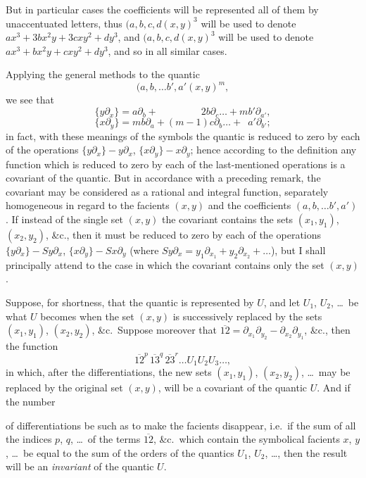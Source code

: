 \documentclass[12pt,a4paper]{article}
\begin{document}
\newpage
\setcounter{page}{230}

But in particular cases the coefficients will be represented all of them by unaccentuated letters, thus $(a, b, c, d \!\!\!\!(x, y)^3$ will be used to denote $ax^3 + 3bx^2y + 3cxy^2 + dy^3$, and $(a, b, c, d \!\!\!\!(x, y)^3$ will be used to denote $ax^3 + bx^2y + cxy^2 + dy^3$, and so in all similar cases.

Applying the general methods to the quantic
\[
(a, b, \ldots b', a' \!\!\!\!(x, y)^m,
\]
we see that
\[
\{y\partial_x\} = a\partial_b + \phantom{(m-1)} 2b\partial_c \ldots + mb'\partial_{a'},
\]
\[
\{x\partial_y\} = mb\partial_a + (m-1)c\partial_b \ldots + \phantom{2} a'\partial_{b'};
\]
in fact, with these meanings of the symbols the quantic is reduced to zero by each of the operations $\{y\partial_x\} - y\partial_x$, $\{x\partial_y\} - x\partial_y$; hence according to the definition any function which is reduced to zero by each of the last-mentioned operations is a covariant of the quantic. But in accordance with a preceding remark, the covariant may be considered as a rational and integral function, separately homogeneous in regard to the facients $(x, y)$ and the coefficients $(a, b, \ldots b', a')$. If instead of the single set $(x, y)$ the covariant contains the sets $(x_1, y_1)$, $(x_2, y_2)$, \&c., then it must be reduced to zero by each of the operations $\{y\partial_x\} - Sy\partial_x$, $\{x\partial_y\} - Sx\partial_y$ (where $Sy\partial_x = y_1\partial_{x_1} + y_2\partial_{x_2} + \ldots$), but I shall principally attend to the case in which the covariant contains only the set $(x, y)$.

Suppose, for shortness, that the quantic is represented by $U$, and let $U_1$, $U_2$, \ldots\ be what $U$ becomes when the set $(x, y)$ is successively replaced by the sets $(x_1, y_1)$, $(x_2, y_2)$, \&c.\ Suppose moreover that $\overline{12} = \partial_{x_1}\partial_{y_2} - \partial_{x_2}\partial_{y_1}$, \&c., then the function
\[
\overline{12}^p \, \overline{13}^q \, \overline{23}^r \ldots U_1 U_2 U_3 \ldots,
\]
in which, after the differentiations, the new sets $(x_1, y_1)$, $(x_2, y_2)$, \ldots\ may be replaced by the original set $(x, y)$, will be a covariant of the quantic $U$. And if the number

\newpage
\setcounter{page}{231}

of differentiations be such as to make the facients disappear, i.e.\ if the sum of all the indices $p$, $q$, \ldots\ of the terms $\overline{12}$, \&c.\ which contain the symbolical facients $x$, $y$, \ldots\ be equal to the sum of the orders of the quantics $U_1$, $U_2$, \ldots, then the result will be an \textit{invariant} of the quantic $U$.
\end{document}
